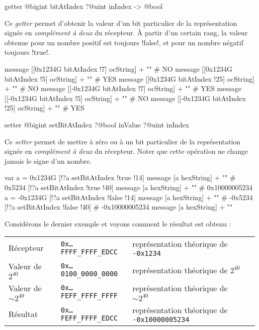 \begin{galgasbox}
getter @bigint bitAtIndex ?@uint inIndex -> @bool
\end{galgasbox}

Ce \emph{getter} permet d'obtenir la valeur d'un bit particulier de la représentation signée en \emph{complément à deux} du récepteur. À partir d'un certain rang, la valeur obtenue pour un nombre positif est toujours \ggs!false!, et pour un nombre négatif toujours \ggs!true!.

\begin{galgas}
message [[0x1234G bitAtIndex !7] ocString] + "\n" # NO
message [[0x1234G bitAtIndex !5] ocString] + "\n" # YES
message [[0x1234G bitAtIndex !25] ocString] + "\n" # NO
message [[-0x1234G bitAtIndex !7] ocString] + "\n" # YES
message [[-0x1234G bitAtIndex !5] ocString] + "\n" # NO
message [[-0x1234G bitAtIndex !25] ocString] + "\n" # YES
\end{galgas}


\begin{galgasbox}
setter @bigint setBitAtIndex ?@bool inValue ?@uint inIndex
\end{galgasbox}

Ce \emph{setter} permet de mettre à zéro ou à un bit particulier de la représentation signée en \emph{complément à deux} du récepteur. Noter que cette opération ne change jamais le signe d'un nombre.

\begin{galgas}
var a = 0x1234G
[!?a setBitAtIndex !true !14]
message [a hexString] + "\n" # 0x5234
[!?a setBitAtIndex !true !40]
message [a hexString] + "\n" # 0x10000005234
a = -0x1234G
[!?a setBitAtIndex !false !14]
message [a hexString] + "\n" # -0x5234
[!?a setBitAtIndex !false !40] # -0x10000005234
message [a hexString] + "\n"
\end{galgas}

Considérons le dernier exemple et voyons comment le résultat est obtenu :

\begin{tabular}{llll}
Récepteur & \texttt{0x…FFFF\_FFFF\_EDCC} & représentation théorique de \texttt{-0x1234}\\
Valeur de $2^{40}$ & \texttt{0x…0100\_0000\_0000} & représentation théorique de $2^{40}$ \\
Valeur de $\sim2^{40}$ & \texttt{0x…FEFF\_FFFF\_FFFF} & représentation théorique de $\sim2^{40}$ \\
Résultat & \texttt{0x…FEFF\_FFFF\_EDCC} & représentation théorique de \texttt{-0x10000005234} \\
\end{tabular}

